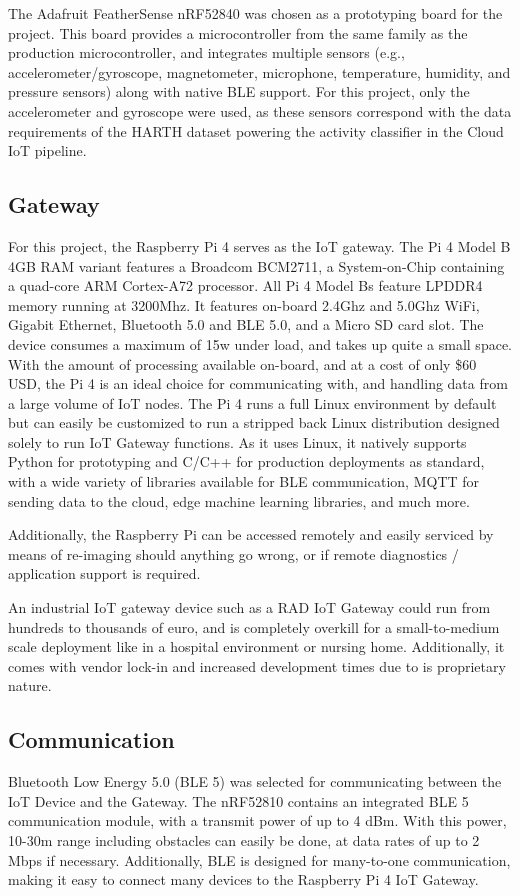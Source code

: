 \documentclass[conference]{IEEEtran}
\begin{document}
The Adafruit FeatherSense nRF52840\cite{b7} was chosen as a prototyping board for the project. This board provides a microcontroller from the same family as the production microcontroller, and integrates multiple sensors (e.g., accelerometer/gyroscope, magnetometer, microphone, temperature, humidity, and pressure sensors) along with native BLE support. For this project, only the accelerometer and gyroscope were used, as these sensors correspond with the data requirements of the HARTH dataset \cite{b5,b6} powering the activity classifier in the Cloud IoT pipeline.

\subsection{Gateway}
For this project, the Raspberry Pi 4 serves as the IoT gateway. The Pi 4 Model B 4GB RAM variant features a Broadcom BCM2711, a System-on-Chip containing a quad-core ARM Cortex-A72 processor. All Pi 4 Model Bs feature LPDDR4 memory running at 3200Mhz. It features on-board 2.4Ghz and 5.0Ghz WiFi, Gigabit Ethernet, Bluetooth 5.0 and BLE 5.0, and a Micro SD card slot. The device consumes a maximum of 15w under load, and takes up quite a small space. With the amount of processing available on-board, and at a cost of only \$60 USD, the Pi 4 is an ideal choice for communicating with, and handling data from a large volume of IoT nodes. The Pi 4 runs a full Linux environment by default but can easily be customized to run a stripped back Linux distribution designed solely to run IoT Gateway functions. As it uses Linux, it natively supports Python for prototyping and C/C++ for production deployments as standard, with a wide variety of libraries available for BLE communication, MQTT for sending data to the cloud, edge machine learning libraries, and much more.

Additionally, the Raspberry Pi can be accessed remotely and easily serviced by means of re-imaging should anything go wrong, or if remote diagnostics / application support is required.

An industrial IoT gateway device such as a RAD IoT Gateway could run from hundreds to thousands of euro, and is completely overkill for a small-to-medium scale deployment like in a hospital environment or nursing home. Additionally, it comes with vendor lock-in and increased development times due to is proprietary nature.

\subsection{Communication}
Bluetooth Low Energy 5.0 (BLE 5) was selected for communicating between the IoT Device and the Gateway. The nRF52810 contains an integrated BLE 5 communication module, with a transmit power of up to 4 dBm. With this power, 10-30m range including obstacles can easily be done, at data rates of up to 2 Mbps if necessary. Additionally, BLE is designed for many-to-one communication, making it easy to connect many devices to the Raspberry Pi 4 IoT Gateway.
\end{document}
